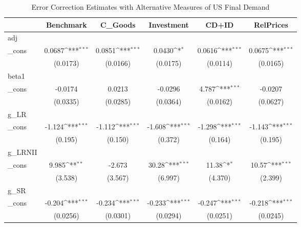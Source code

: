 \begin{table}[htbp]\centering
\def\sym#1{\ifmmode^{#1}\else\(^{#1}\)\fi}
\caption{Error Correction Estimates with Alternative Measures of US Final Demand}
\begin{tabular}{l*{5}{c}}
\hline\hline
          &\multicolumn{1}{c}{Benchmark}&\multicolumn{1}{c}{C\_Goods}&\multicolumn{1}{c}{Investment}&\multicolumn{1}{c}{CD+ID}&\multicolumn{1}{c}{RelPrices}\\
\hline
adj       &                  &                  &                  &                  &                  \\
\_cons    &   0.0687\sym{***}&   0.0851\sym{***}&   0.0430\sym{*}  &   0.0616\sym{***}&   0.0675\sym{***}\\
          & (0.0173)         & (0.0166)         & (0.0175)         & (0.0114)         & (0.0165)         \\
[1em]
beta1     &                  &                  &                  &                  &                  \\
\_cons    &  -0.0174         &   0.0213         &  -0.0296         &    4.787\sym{***}&  -0.0207         \\
          & (0.0335)         & (0.0285)         & (0.0364)         & (0.0162)         & (0.0627)         \\
[1em]
g\_LR      &                  &                  &                  &                  &                  \\
\_cons    &   -1.124\sym{***}&   -1.112\sym{***}&   -1.608\sym{***}&   -1.298\sym{***}&   -1.143\sym{***}\\
          &  (0.195)         &  (0.150)         &  (0.372)         &  (0.164)         &  (0.195)         \\
[1em]
g\_LRNII   &                  &                  &                  &                  &                  \\
\_cons    &    9.985\sym{**} &   -2.673         &    30.28\sym{***}&    11.38\sym{*}  &    10.57\sym{***}\\
          &  (3.538)         &  (3.567)         &  (6.997)         &  (4.370)         &  (2.399)         \\
[1em]
g\_SR      &                  &                  &                  &                  &                  \\
\_cons    &   -0.204\sym{***}&   -0.234\sym{***}&   -0.233\sym{***}&   -0.247\sym{***}&   -0.218\sym{***}\\
          & (0.0256)         & (0.0301)         & (0.0294)         & (0.0251)         & (0.0245)         \\

\end{tabular}
\end{table}
